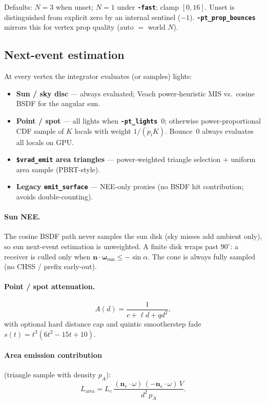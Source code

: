\documentclass[11pt,a4paper]{article}
\newcommand{\flag}[1]{\texttt{\bfseries #1}}
\newcommand{\vmt}[1]{\texttt{\$#1}}
\newcommand{\code}[1]{\texttt{#1}}
\newcommand{\vect}[1]{\bm{#1}}
\begin{document}
Defaults: $N=3$ when unset; $N=1$ under \flag{-fast}; clamp $[0,16]$.
Unset is distinguished from explicit zero by an internal sentinel ($-1$).
\flag{-pt\_prop\_bounces} mirrors this for vertex prop quality
(auto $=$ world $N$).

\subsection{Next-event estimation}

At every vertex the integrator evaluates (or samples) lights:

\begin{itemize}[leftmargin=1.4em]
  \item \textbf{Sun / sky disc} --- always evaluated; Veach power-heuristic MIS
        vs.\ cosine BSDF for the angular sun.
  \item \textbf{Point / spot} --- all lights when \flag{-pt\_lights}~$0$;
        otherwise power-proportional CDF sample of $K$ locals with weight
        $1/(p_i K)$. Bounce~$0$ always evaluates all locals on GPU.
  \item \textbf{\vmt{vrad\_emit} area triangles} --- power-weighted triangle
        selection $+$ uniform area sample (PBRT-style).
  \item \textbf{Legacy \code{emit\_surface}} --- NEE-only proxies (no BSDF hit
        contribution; avoids double-counting).
\end{itemize}

\paragraph{Sun NEE.}
The cosine BSDF path never samples the sun disk (sky misses add ambient only),
so sun next-event estimation is unweighted. A finite disk wraps past $90^\circ$:
a receiver is culled only when $\vect{n}\cdot\vect{\omega}_{\mathrm{sun}}\le -\sin\alpha$.
The cone is always fully sampled (no CHSS / prefix early-out).

\paragraph{Point / spot attenuation.}
\begin{equation}
  A(d)=\frac{1}{c+\ell d+q d^{2}},
\end{equation}
with optional hard distance cap and quintic smootherstep fade
$s(t)=t^{3}(6t^{2}-15t+10)$.

\paragraph{Area emission contribution} (triangle sample with density $p_A$):
\begin{equation}
  L_{\mathrm{area}}
  =
  L_e\,
  \frac
  {(\vect{n}_r\cdot\omega)\,(-\vect{n}_e\cdot\omega)\,V}
  {d^{2}\,p_A}.
\end{equation}
\end{document}
